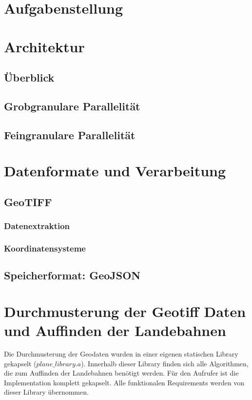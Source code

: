\documentclass[10pt,a4paper]{report}
\begin{document}
\chapter{Aufgabenstellung}

\chapter{Architektur}

\section{Überblick}
\section{Grobgranulare Parallelität}
\section{Feingranulare Parallelität}

\chapter{Datenformate und Verarbeitung}
\section{GeoTIFF}
\subsection{Datenextraktion}
\subsection{Koordinatensysteme}
\section{Speicherformat: GeoJSON}

\chapter{Durchmusterung der Geotiff Daten und Auffinden der Landebahnen}
Die Durchmusterung der Geodaten wurden in einer eigenen statischen Library gekapselt ($plane\_library.a$). Innerhalb dieser Library finden sich alle Algorithmen, die zum Auffinden der Landebahnen benötigt werden. Für den Aufrufer ist die Implementation komplett gekapselt. Alle funktionalen Requirements werden von dieser Library übernommen.
\end{document}
